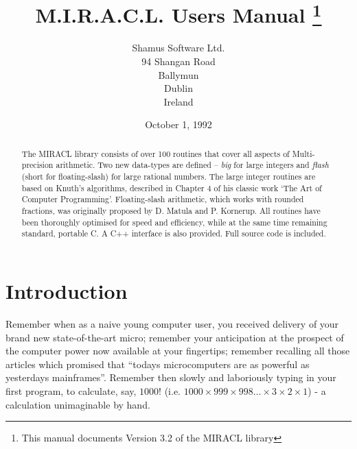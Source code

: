 \raggedbottom
\parindent=0mm
\parskip=3mm
\textheight=182mm
\textwidth=113mm

\title{M.I.R.A.C.L. Users Manual \thanks{This manual documents Version 3.2 
of the MIRACL library}} 
\author{Shamus Software Ltd.\\
        94 Shangan Road\\
          Ballymun\\
          Dublin\\
          Ireland}

\date{October 1, 1992}


\maketitle                 %


\tableofcontents

\begin{abstract}
The MIRACL library consists of over 100 routines that cover all aspects
of Multi-precision arithmetic. Two new data-types are defined -- {\em big} for 
large integers and {\em flash} (short for floating-slash) for large rational 
numbers. The large integer routines are based on Knuth's algorithms, 
described in Chapter 4 of his classic work `The Art of Computer Programming'. 
Floating-slash arithmetic, which works with rounded fractions, was originally 
proposed by D. Matula and P. Kornerup. All routines have been thoroughly 
optimised for speed and efficiency, while at the same time remaining standard, 
portable C. A C++ interface is also provided. Full source code is included.
\end{abstract}

\chapter{Introduction} 


Remember when as a naive young computer user,  you received  delivery  of 
your brand new state-of-the-art micro;  remember your anticipation at the 
prospect of the computer power now available at your fingertips; remember 
recalling all those articles which promised that  ``todays  microcomputers 
are  as  powerful  as  yesterdays  mainframes''.  Remember then slowly and 
laboriously typing in your first program, to calculate, say,  $1000!$  (i.e. 
$1000\times999\times998\ldots\times3\times2\times1$) - a calculation unimaginable 
by hand.  


